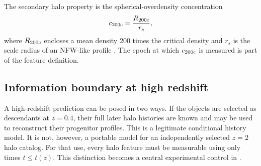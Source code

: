 The secondary halo property is the spherical-overdensity concentration
\begin{equation}
  c_{200\mathrm{c}}=\frac{R_{200\mathrm{c}}}{r_s},
  \label{eq:concentration}
\end{equation}
where $R_{200\mathrm{c}}$ encloses a mean density 200 times the critical density and $r_s$
is the scale radius of an NFW-like profile \citep{Navarro1997}. The epoch at
which $c_{200\mathrm{c}}$ is measured is part of the feature definition.

\subsection{Information boundary at high redshift}

A high-redshift prediction can be posed in two ways. If the objects are selected
as descendants at $z=0.4$, their full later halo histories are known and may be
used to reconstruct their progenitor profiles. This is a legitimate conditional
history model. It is not, however, a portable model for an independently
selected $z=2$ halo catalog. For that use, every halo feature must be measurable
using only times $t\leq t(z)$. This distinction becomes a central experimental
control in \ExpFiftyOne{}.
